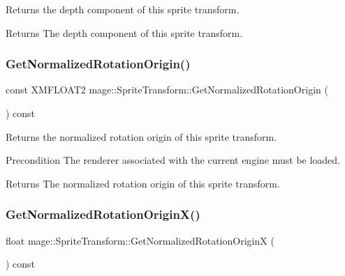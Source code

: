 Returns the depth component of this sprite transform.

\begin{DoxyReturn}{Returns}
The depth component of this sprite transform. 
\end{DoxyReturn}
\hypertarget{structmage_1_1_sprite_transform_aae811b88ac3cbd5ac18c67ddd81bef99}{}\label{structmage_1_1_sprite_transform_aae811b88ac3cbd5ac18c67ddd81bef99} 
\subsubsection{\texorpdfstring{Get\+Normalized\+Rotation\+Origin()}{GetNormalizedRotationOrigin()}}
{\footnotesize\ttfamily const X\+M\+F\+L\+O\+A\+T2 mage\+::\+Sprite\+Transform\+::\+Get\+Normalized\+Rotation\+Origin (\begin{DoxyParamCaption}{ }\end{DoxyParamCaption}) const}

Returns the normalized rotation origin of this sprite transform.

\begin{DoxyPrecond}{Precondition}
The renderer associated with the current engine must be loaded. 
\end{DoxyPrecond}
\begin{DoxyReturn}{Returns}
The normalized rotation origin of this sprite transform. 
\end{DoxyReturn}
\hypertarget{structmage_1_1_sprite_transform_a1122781a24349c230e9f183197a170d8}{}\label{structmage_1_1_sprite_transform_a1122781a24349c230e9f183197a170d8} 
\subsubsection{\texorpdfstring{Get\+Normalized\+Rotation\+Origin\+X()}{GetNormalizedRotationOriginX()}}
{\footnotesize\ttfamily float mage\+::\+Sprite\+Transform\+::\+Get\+Normalized\+Rotation\+OriginX (\begin{DoxyParamCaption}{ }\end{DoxyParamCaption}) const}

